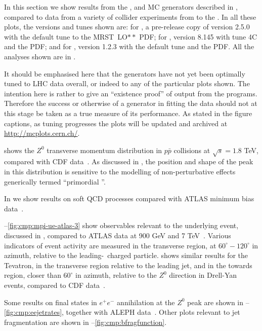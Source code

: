 In this section we show results from the \herwigpp, \pythiaeight and \sherpa MC
generators described in , compared to data from a
variety of collider experiments from \lep to the \lhc. In all these plots, the
versions and tunes shown are: for \herwigpp, a pre-release copy of version 2.5.0
with the default tune to the MRST~LO$**$ PDF; for \pythiaeight, version 8.145
with tune 4C and the  PDF; and for \sherpa, version 1.2.3 with the
default tune and the  PDF. All the analyses shown are in \rivet.

It should be emphasised here that the generators have not yet been optimally
tuned to LHC data overall, or indeed to any of the particular plots shown.  The
intention here is rather to give an ``existence proof'' of output from the
programs.  Therefore the success or otherwise of a generator in fitting the data
should not at this stage be taken as a true measure of its performance.  As
stated in the figure captions, as tuning progresses the plots will be updated
and archived at \url{http://mcplots.cern.ch/}.

 shows the $Z^0$ transverse momentum
distribution in $p\bar p$ collisions at $\sqrt s=1.8$ TeV, compared
with CDF data~\cite{Affolder:1999jh}.  As discussed in , the
position and shape of the peak in this distribution is sensitive to
the modelling of non-perturbative effects generically termed
``primordial \kT''.

In  we show results on soft QCD processes
compared with ATLAS minimum bias data~\cite{Atlas:2010xx}.

--\ref{fig:cmp:mpi-ue-atlas-3} show
observables relevant to the underlying event, discussed in
, compared to ATLAS data at 900 GeV
  and 7 TeV~\cite{Aad:2010fh}.  Various indicators of event activity
  are measured in the transverse region, \ie at $60^\circ-120^\circ$ in
  azimuth, relative to the leading-\pt\ charged particle.
 shows similar results for the Tevatron, in
the transverse region relative to the leading jet, and in the towards
region, \ie closer than $60^\circ$ in azimuth, relative to the $Z^0$
direction in Drell-Yan events, compared to CDF data~\cite{Aaltonen:2010rm}.

Some results on final states in $e^+e^-$ annihilation at the $Z^0$
peak are shown in
--\ref{fig:cmp:eejetrates}, together with
ALEPH data~\cite{Barate:1996fi,Heister:2003aj}.  Other plots relevant to jet
fragmentation are shown in
--\ref{fig:cmp:bfragfunction}.

